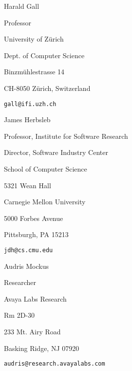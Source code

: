 \documentclass[margin,line,article]{res}
\newenvironment{list1}{
  \begin{list}{}{%
      \setlength{\itemsep}{0in}
      \setlength{\parsep}{0in} \setlength{\parskip}{0in}
      \setlength{\topsep}{0in} \setlength{\partopsep}{0in} 
      \setlength{\leftmargin}{0.17in}}}{\end{list}}
\begin{document}
\begin{resume}
Harald Gall
\begin{list1}
\item Professor
\item University of Z\"urich
\item Dept. of Computer Science
\item Binzm\"uhlestrasse 14
\item CH-8050 Z\"urich, Switzerland
\item \texttt{gall@ifi.uzh.ch}
\end{list1}

James Herbsleb
\begin{list1}
\item Professor, Institute for Software Research
\item Director, Software Industry Center
\item School of Computer Science
\item 5321 Wean Hall
\item Carnegie Mellon University
\item 5000 Forbes Avenue
\item Pittsburgh, PA 15213
\item \texttt{jdh@cs.cmu.edu}
\end{list1}

Audris Mockus
\begin{list1}
\item Researcher
\item Avaya Labs Research
\item Rm 2D-30
\item 233 Mt. Airy Road
\item Basking Ridge, NJ 07920
\item \texttt{audris@research.avayalabs.com}
\end{list1}

\end{resume}
\end{document}
